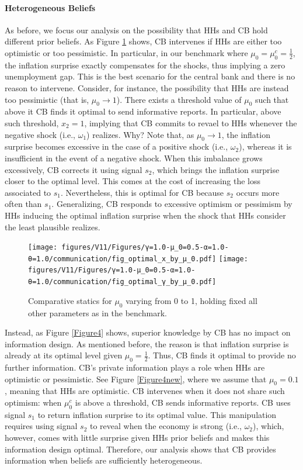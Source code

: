 \documentclass[12pt,a4paper]{article}
\begin{document}
\paragraph{Heterogeneous Beliefs}
As before, we focus our analysis on the possibility that HHs and CB hold different prior beliefs. As Figure \ref{Figure3} shows, CB intervenes if HHs are either too optimistic or too pessimistic. In particular, in our benchmark where $\mu_0=\mu_0^c=\frac{1}{2}$, the inflation surprise exactly compensates for the shocks, thus implying a zero unemployment gap. This is the best scenario for the central bank and there is no reason to intervene. Consider, for instance, the possibility that HHs are instead too pessimistic (that is, $\mu_0\to 1$). There exists a threshold value of $\mu_0$ such that above it CB finds it optimal to send informative reports. In particular, above such threshold, $x_2=1$, implying that CB commits to revael to HHs whenever the negative shock (i.e., $\omega_1$) realizes. Why? Note that, as $\mu_0\to 1$, the inflation surprise becomes excessive in the case of a positive shock (i.e., $\omega_2$), whereas it is insufficient in the event of a negative shock. When this imbalance grows excessively, CB corrects it using signal $s_2$, which brings the inflation surprise closer to the optimal level. This comes at the cost of increasing the loss associated to $s_1$. Nevertheless, this is optimal for CB because $s_2$ occurs more often than $s_1$. Generalizing, CB responds to excessive optimism or pessimism by HHs inducing the optimal inflation surprise when the shock that HHs consider the least plausible realizes.

\begin{figure}[H]
\centering
\texttt{[image: figures/V11/Figures/γ=1.0-μ\_0=0.5-α=1.0-θ=1.0/communication/fig\_optimal\_x\_by\_μ\_0.pdf]}
\texttt{[image: figures/V11/Figures/γ=1.0-μ\_0=0.5-α=1.0-θ=1.0/communication/fig\_optimal\_γ\_by\_μ\_0.pdf]}
\caption{Comparative statics for $\mu_0$ varying from 0 to 1, holding fixed all other parameters as in the benchmark.}
\label{Figure3}
\end{figure}

Instead, as Figure \ref{Figure4} shows, superior knowledge by CB has no impact on information design. As mentioned before, the reason is that inflation surprise is already at its optimal level given $\mu_0=\frac{1}{2}$. Thus, CB finds it optimal to provide no further information. CB's private information plays a role when HHs are optimistic or pessimistic. See Figure \ref{Figure4new}, where we assume that $\mu_0 = 0.1$, meaning that HHs are optimistic. CB intervenes when it does not share such optimism: when $\mu_0^c$ is above a threshold, CB sends informative reports. CB uses signal $s_1$ to return inflation surprise to its optimal value. This manipulation requires using signal $s_2$ to reveal when the economy is strong (i.e., $\omega_2$), which, however, comes with little surprise given HHs prior beliefs and makes this information design optimal. Therefore, our analysis shows that CB provides information when beliefs are sufficiently heterogeneous. 
\end{document}
